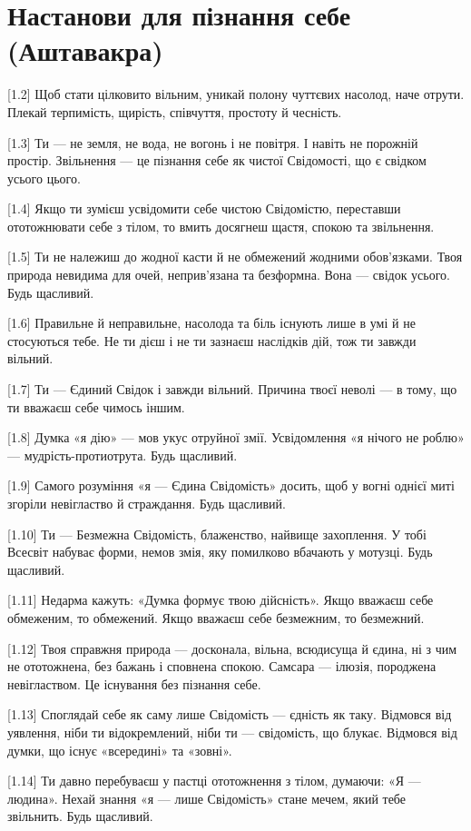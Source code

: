 \chapter[(Аштавакра)]{Настанови для пізнання себе (Аштавакра)}

[1.2] Щоб стати цілковито вільним, уникай полону чуттєвих насолод, наче отрути. Плекай терпимість, щирість, співчуття, простоту й чесність.

[1.3] Ти --- не земля, не вода, не вогонь і не повітря. І навіть не порожній простір. Звільнення --- це пізнання себе як чистої Свідомості, що є свідком усього цього.

[1.4] Якщо ти зумієш усвідомити себе чистою Свідомістю, переставши ототожнювати себе з тілом, то вмить досягнеш щастя, спокою та звільнення.

[1.5] Ти не належиш до жодної касти й не обмежений жодними обов'язками. Твоя природа невидима для очей, неприв'язана та безформна. Вона --- свідок усього. Будь щасливий.

[1.6] Правильне й неправильне, насолода та біль існують лише в умі й не стосуються тебе. Не ти дієш і не ти зазнаєш наслідків дій, тож ти завжди вільний.

[1.7] Ти --- Єдиний Свідок і завжди вільний. Причина твоєї неволі --- в тому, що ти вважаєш себе чимось іншим.

[1.8] Думка «я дію» --- мов укус отруйної змії. Усвідомлення «я нічого не роблю» --- мудрість-протиотрута. Будь щасливий.

[1.9] Самого розуміння «я --- Єдина Свідомість» досить, щоб у вогні однієї миті згоріли невігластво й страждання. Будь щасливий.

[1.10] Ти --- Безмежна Свідомість, блаженство, найвище захоплення. У тобі Всесвіт набуває форми, немов змія, яку помилково вбачають у мотузці. Будь щасливий.

[1.11] Недарма кажуть: «Думка формує твою дійсність». Якщо вважаєш себе обмеженим, то обмежений. Якщо вважаєш себе безмежним, то безмежний.

[1.12] Твоя справжня природа --- досконала, вільна, всюдисуща й єдина, ні з чим не ототожнена, без бажань і сповнена спокою. Самсара --- ілюзія, породжена невіглаством. Це існування без пізнання себе.

[1.13] Споглядай себе як саму лише Свідомість --- єдність як таку. Відмовся від уявлення, ніби ти відокремлений, ніби ти --- свідомість, що блукає. Відмовся від думки, що існує «всередині» та «зовні».

[1.14] Ти давно перебуваєш у пастці ототожнення з тілом, думаючи: «Я --- людина». Нехай знання «я --- лише Свідомість» стане мечем, який тебе звільнить. Будь щасливий.

